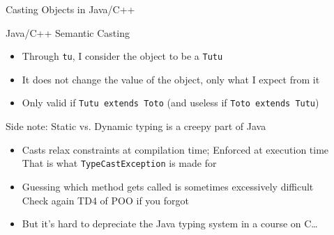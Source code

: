 \begin{Coupe}
\begin{frame}{Casting Objects in Java/C++}
\begin{block}{Java/C++ Semantic Casting}
    \begin{itemize}
    \item Through \texttt{tu}, I consider the object to be a \texttt{Tutu}
    \item It does not change the value of the object, only what I expect from it
    \item Only valid if \texttt{Tutu extends Toto} (and useless if \texttt{Toto extends Tutu})
    \end{itemize}    
  \end{block}
  \begin{block}{Side note: Static vs. Dynamic typing is a creepy part of Java}
    \begin{itemize}
    \item Casts relax constraints at compilation time; Enforced at execution time\\
      That is what \texttt{TypeCastException} is made for
    \item Guessing which method gets called is sometimes excessively
      difficult\\
      {\small Check again TD4 of POO if you forgot}
    \item But it's hard to depreciate the Java typing system in a course on C\ldots
    \end{itemize}
  \end{block}
\end{frame}
\end{Coupe}
